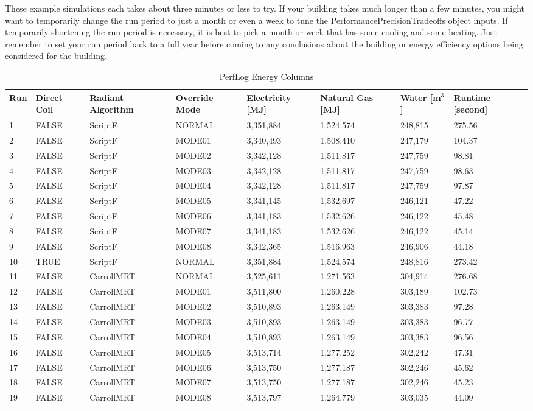 These example simulations each takes about three minutes or less to try. If your building takes much longer than a few minutes, you might want to temporarily change the run period to just a month or even a week to tune the PerformancePrecisionTradeoffs object inputs. If temporarily shortening the run period is necessary, it is best to pick a month or week that has some cooling and some heating. Just remember to set your run period back to a full year before coming to any conclusions about the building or energy efficiency options being considered for the building.

        {\scriptsize
\begin{longtable}[c]{p{0.2in}p{0.4in}p{0.55in}p{0.7in}p{0.5in}p{0.5in}p{0.7in}p{0.6in}}
    \caption{PerfLog Energy Columns\label{table:perflog_energy_columns}} \tabularnewline
    \toprule
    Run &
    Direct Coil &
    Radiant Algorithm &
    Override Mode &
    Electricity {[}MJ{]} &
    Natural Gas {[}MJ{]} &
    Water {[}m$^3${]} &
    Runtime {[}second{]} \tabularnewline
    \midrule
    \endfirsthead

    1  & FALSE & ScriptF  & NORMAL & 3,351,884 & 1,524,574 & 248,815 & 275.56 \tabularnewline
    2  & FALSE & ScriptF  & MODE01 & 3,340,493 & 1,508,410 & 247,179 & 104.37  \tabularnewline
    3  & FALSE & ScriptF  & MODE02 & 3,342,128 & 1,511,817 & 247,759 & 98.81  \tabularnewline
    4  & FALSE & ScriptF  & MODE03 & 3,342,128 & 1,511,817 & 247,759 & 98.63  \tabularnewline
    5  & FALSE & ScriptF  & MODE04 & 3,342,128 & 1,511,817 & 247,759 & 97.87  \tabularnewline
    6  & FALSE & ScriptF  & MODE05 & 3,341,145 & 1,532,697 & 246,121 & 47.22  \tabularnewline
    7  & FALSE & ScriptF  & MODE06 & 3,341,183 & 1,532,626 & 246,122 & 45.48  \tabularnewline
    8  & FALSE & ScriptF  & MODE07 & 3,341,183 & 1,532,626 & 246,122 & 45.14  \tabularnewline
    9  & FALSE & ScriptF  & MODE08 & 3,342,365 & 1,516,963 & 246,906 & 44.18  \tabularnewline
    10  & TRUE  & ScriptF  & NORMAL & 3,351,884 & 1,524,574 & 248,816 & 273.42 \tabularnewline
    11 & FALSE & CarrollMRT & NORMAL & 3,525,611 & 1,271,563 & 304,914 & 276.68 \tabularnewline
    12 & FALSE & CarrollMRT & MODE01 & 3,511,800 & 1,260,228 & 303,189 & 102.73  \tabularnewline
    13 & FALSE & CarrollMRT & MODE02 & 3,510,893 & 1,263,149 & 303,383 & 97.28  \tabularnewline
    14 & FALSE & CarrollMRT & MODE03 & 3,510,893 & 1,263,149 & 303,383 & 96.77  \tabularnewline
    15 & FALSE & CarrollMRT & MODE04 & 3,510,893 & 1,263,149 & 303,383 & 96.56  \tabularnewline
    16 & FALSE & CarrollMRT & MODE05 & 3,513,714 & 1,277,252 & 302,242 & 47.31  \tabularnewline
    17 & FALSE & CarrollMRT & MODE06 & 3,513,750 & 1,277,187 & 302,246 & 45.62  \tabularnewline
    18 & FALSE & CarrollMRT & MODE07 & 3,513,750 & 1,277,187 & 302,246 & 45.23  \tabularnewline
    19 & FALSE & CarrollMRT & MODE08 & 3,513,797 & 1,264,779 & 303,035 & 44.09  \tabularnewline

    \bottomrule
\end{longtable}
}

